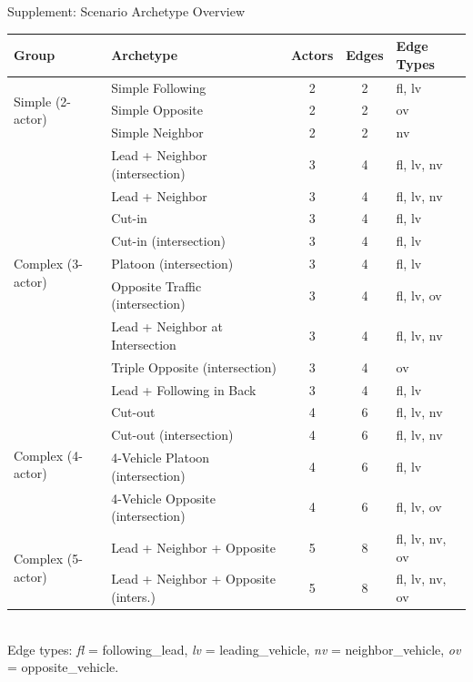 \documentclass[aspectratio=169]{beamer}
\begin{document}
\begin{frame}{Supplement: Scenario Archetype Overview}
\centering
\renewcommand{\arraystretch}{0.85}
\tiny
\begin{tabular}{llccl}
\toprule
\textbf{Group} & \textbf{Archetype} & \textbf{Actors} & \textbf{Edges} & \textbf{Edge Types} \\
\midrule
\multirow{3}{*}{Simple (2-actor)}
  & Simple Following           & 2 & 2 & fl, lv \\
  & Simple Opposite            & 2 & 2 & ov \\
  & Simple Neighbor            & 2 & 2 & nv \\
\midrule
\multirow{9}{*}{Complex (3-actor)}
  & Lead + Neighbor (intersection)       & 3 & 4 & fl, lv, nv \\
  & Lead + Neighbor                      & 3 & 4 & fl, lv, nv \\
  & Cut-in                               & 3 & 4 & fl, lv \\
  & Cut-in (intersection)                & 3 & 4 & fl, lv \\
  & Platoon (intersection)               & 3 & 4 & fl, lv \\
  & Opposite Traffic (intersection)      & 3 & 4 & fl, lv, ov \\
  & Lead + Neighbor at Intersection      & 3 & 4 & fl, lv, nv \\
  & Triple Opposite (intersection)       & 3 & 4 & ov \\
  & Lead + Following in Back             & 3 & 4 & fl, lv \\
\midrule
\multirow{4}{*}{Complex (4-actor)}
  & Cut-out                              & 4 & 6 & fl, lv, nv \\
  & Cut-out (intersection)               & 4 & 6 & fl, lv, nv \\
  & 4-Vehicle Platoon (intersection)     & 4 & 6 & fl, lv \\
  & 4-Vehicle Opposite (intersection)    & 4 & 6 & fl, lv, ov \\
\midrule
\multirow{2}{*}{Complex (5-actor)}
  & Lead + Neighbor + Opposite           & 5 & 8 & fl, lv, nv, ov \\
  & Lead + Neighbor + Opposite (inters.) & 5 & 8 & fl, lv, nv, ov \\
\bottomrule
\end{tabular}
\vspace{0.5em}
\normalsize\footnotesize\\
Edge types: \textit{fl} = following\_lead, \textit{lv} = leading\_vehicle, \textit{nv} = neighbor\_vehicle, \textit{ov} = opposite\_vehicle.
\end{frame}
\end{document}
